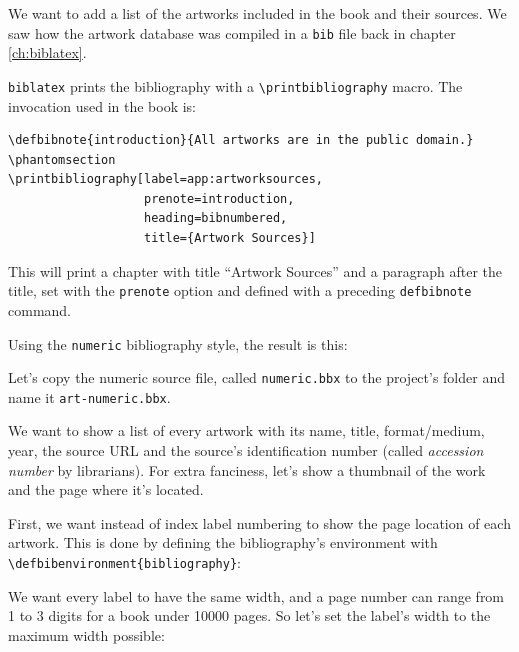 \documentclass[16pt,letter,oneside,usenames,dvipsnames]{memoir}
\newcommand\biblatex{\texttt{biblatex}\xspace}%
\begin{document}
We want to add a list of the artworks included in the book and their
sources. We saw how the artwork database was compiled in a \texttt{bib}
file back in chapter \hyperref[ch:biblatex]{\ref{ch:biblatex}}.

\biblatex prints the bibliography with a
\texttt{\textbackslash{}printbibliography} macro. The invocation used in
the book is:

\begin{verbatim}
\defbibnote{introduction}{All artworks are in the public domain.}
\phantomsection
\printbibliography[label=app:artworksources,
                   prenote=introduction,
                   heading=bibnumbered,
                   title={Artwork Sources}]
\end{verbatim}

This will print a chapter with title ``Artwork Sources'' and a paragraph
after the title, set with the \texttt{prenote} option and defined with a
preceding \texttt{defbibnote} command.

Using the \texttt{numeric} bibliography style, the result is this:

\begin{figure}
{\centering%
%
\skelcaption[width=0.2\textwidth,lines=1]{}}
\end{figure}

Let's copy the numeric source file, called \texttt{numeric.bbx} to the
project's folder and name it \texttt{art-numeric.bbx}.

We want to show a list of every artwork with its name, title,
format/medium, year, the source URL and the source's identification
number (called \emph{accession number} by librarians). For extra
fanciness, let's show a thumbnail of the work and the page where it's
located.

First, we want instead of index label numbering to show the page
location of each artwork. This is done by defining the bibliography's
environment with
\texttt{\textbackslash{}defbibenvironment\{bibliography\}}:

\begin{figure}
{\centering%
%
\skelcaption[width=0.2\textwidth,lines=1]{}}
\end{figure}

We want every label to have the same width, and a page number can range
from 1 to 3 digits for a book under 10\thinspace{}000 pages. So let's
set the label's width to the maximum width possible:
\end{document}
